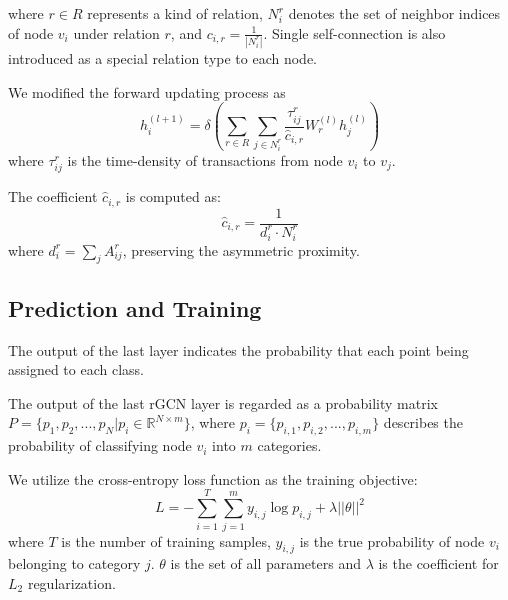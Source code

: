 where $r \in R$ represents a kind of relation, $N_i^r$ denotes the set of neighbor indices of node $v_i$ under relation $r$, and $c_{i,r}=\frac{1}{|N_i^r|}$. Single self-connection is also introduced as a special relation type to each node. %

We modified the forward updating process as 
\begin{equation}
h_i^{(l+1)}=\delta(\sum_{r\in R} \sum_{j \in N_i^r} \frac{\tau_{ij}^r}{\hat c_{i,r}}W_r^{(l)}h_j^{(l)})
\end{equation}
where $\tau_{ij}^r$ is the time-density of transactions from node $v_i$ to $v_j$. 

The coefficient $\hat c_{i,r}$ is computed as:
\begin{equation}
\hat c_{i,r}=\frac{1}{d_i^r\cdot N_i^r}
\end{equation}
where $d_i^r=\sum_{j}A^r_{ij}$, preserving the asymmetric proximity.


\subsection{Prediction and Training}
The output of the last layer indicates the probability that each point being assigned to each class.

The output of the last rGCN layer is regarded as a probability matrix $P=\{p_1,p_2,...,p_N|p_i\in \mathbb{R}^{N \times m}\}$, where $p_i=\{p_{i,1},p_{i,2},...,p_{i,m}\}$ describes the probability of classifying node $v_i$ into $m$ categories. 

We utilize the cross-entropy loss function as the training objective:
\begin{equation}
L=-\sum_{i=1}^T\sum_{j=1}^m y_{i,j}\log p_{i,j}+\lambda ||\theta||^2
\end{equation}
where $T$ is the number of training samples, $y_{i,j}$ is the true probability of node $v_i$ belonging to category $j$. $\theta$ is the set of all parameters and $\lambda$ is the coefficient for $L_2$  regularization.

